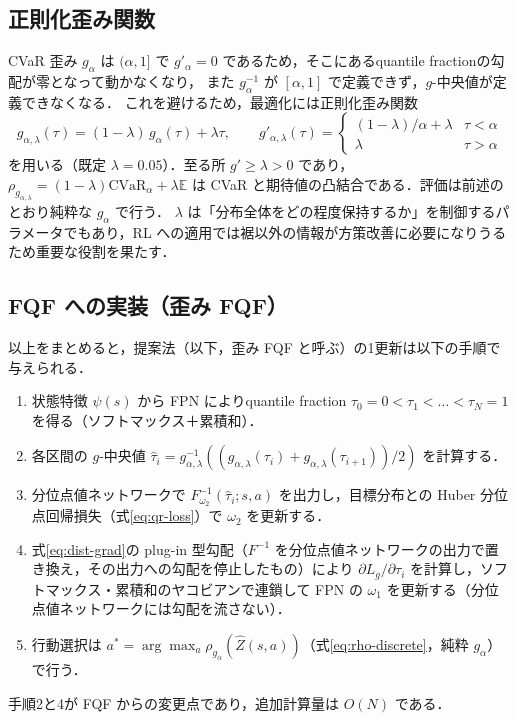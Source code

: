 \documentclass[a4paper,10pt]{jsarticle}
\theoremstyle{definition}
\newcommand{\CVaR}{\mathrm{CVaR}}
\newcommand{\Finv}{F^{-1}}
\newcommand{\E}{\mathbb{E}}
\begin{document}
\subsection{正則化歪み関数}
CVaR 歪み $g_\alpha$ は $(\alpha,1]$ で $g'_\alpha=0$ であるため，そこにあるquantile fractionの勾配が零となって動かなくなり，
また $g_\alpha^{-1}$ が $[\alpha,1]$ で定義できず，$g$-中央値が定義できなくなる．
これを避けるため，最適化には正則化歪み関数
\begin{equation}
  g_{\alpha,\lambda}(\tau)=(1-\lambda)\,g_\alpha(\tau)+\lambda\tau,\qquad
  g'_{\alpha,\lambda}(\tau)=\begin{cases}(1-\lambda)/\alpha+\lambda & \tau<\alpha\\ \lambda & \tau>\alpha\end{cases}
  \label{eq:g-reg}
\end{equation}
を用いる（既定 $\lambda=0.05$）．至る所 $g'\ge\lambda>0$ であり，$\rho_{g_{\alpha,\lambda}}=(1-\lambda)\CVaR_\alpha+\lambda\E$ は
CVaR と期待値の凸結合である．評価は前述のとおり純粋な $g_\alpha$ で行う．
$\lambda$ は「分布全体をどの程度保持するか」を制御するパラメータでもあり，RL への適用では裾以外の情報が方策改善に必要になりうるため重要な役割を果たす．

\subsection{FQF への実装（歪み FQF）}
\label{subsec:impl}
以上をまとめると，提案法（以下，歪み FQF と呼ぶ）の1更新は以下の手順で与えられる．
\begin{enumerate}
  \item 状態特徴 $\psi(s)$ から FPN によりquantile fraction $\tau_0=0<\tau_1<\dots<\tau_N=1$ を得る（ソフトマックス＋累積和）．
  \item 各区間の $g$-中央値 $\hat\tau_i=g_{\alpha,\lambda}^{-1}\!\left((g_{\alpha,\lambda}(\tau_i)+g_{\alpha,\lambda}(\tau_{i+1}))/2\right)$ を計算する．
  \item 分位点値ネットワークで $\Finv_{\omega_2}(\hat\tau_i;s,a)$ を出力し，目標分布との Huber 分位点回帰損失（式\eqref{eq:qr-loss}）で $\omega_2$ を更新する．
  \item 式\eqref{eq:dist-grad}の plug-in 型勾配（$\Finv$ を分位点値ネットワークの出力で置き換え，その出力への勾配を停止したもの）により $\partial L_g/\partial\tau_i$ を計算し，ソフトマックス・累積和のヤコビアンで連鎖して FPN の $\omega_1$ を更新する（分位点値ネットワークには勾配を流さない）．
  \item 行動選択は $a^*=\arg\max_a\rho_{g_\alpha}(\hat Z(s,a))$（式\eqref{eq:rho-discrete}，純粋 $g_\alpha$）で行う．
\end{enumerate}
手順2と4が FQF からの変更点であり，追加計算量は $O(N)$ である．
\end{document}

